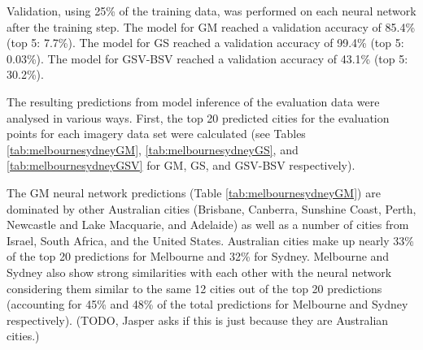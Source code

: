 \documentclass[10pt,letterpaper]{article}
\begin{document}
Validation, using 25\% of the training data, was performed on each neural network after the training step. The model for GM reached a validation accuracy of 85.4\% (top 5: 7.7\%). The model for GS reached a validation accuracy of 99.4\% (top 5: 0.03\%). The model for GSV-BSV reached a validation accuracy of 43.1\% (top 5: 30.2\%).

The resulting predictions from model inference of the evaluation data were analysed in various ways. First, the top 20 predicted cities for the evaluation points for each imagery data set were calculated (see Tables \ref{tab:melbournesydneyGM}, \ref{tab:melbournesydneyGS}, and \ref{tab:melbournesydneyGSV} for GM, GS, and GSV-BSV respectively).



The GM neural network predictions (Table \ref{tab:melbournesydneyGM}) are dominated by other Australian cities (Brisbane, Canberra, Sunshine Coast, Perth, Newcastle and Lake Macquarie, and Adelaide) as well as a number of cities from Israel, South Africa, and the United States. Australian cities make up nearly 33\% of the top 20 predictions for Melbourne and 32\% for Sydney. Melbourne and Sydney also show strong similarities with each other with the neural network considering them similar to the same 12 cities out of the top 20 predictions (accounting for 45\% and 48\% of the total predictions for Melbourne and Sydney respectively). (TODO, Jasper asks if this is just because they are Australian cities.)
\end{document}
